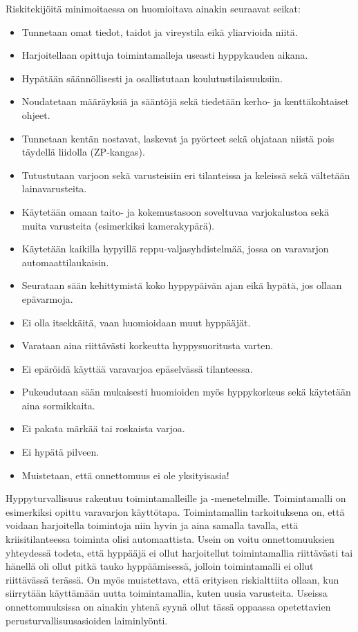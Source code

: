 Riskitekijöitä minimoitaessa on huomioitava ainakin seuraavat seikat: 

\begin{itemize}
\item  Tunnetaan omat tiedot, taidot ja vireystila eikä yliarvioida niitä. 
\item  Harjoitellaan opittuja toimintamalleja useasti hyppykauden aikana. 
\item  Hypätään säännöllisesti ja osallistutaan koulutustilaisuuksiin. 
\item  Noudatetaan määräyksiä ja sääntöjä sekä tiedetään kerho- ja kenttäkohtaiset ohjeet. 
\item  Tunnetaan kentän nostavat, laskevat ja pyörteet sekä ohjataan niistä pois täydellä liidolla (ZP-kangas). 
\item  Tutustutaan varjoon sekä varusteisiin eri tilanteissa ja keleissä sekä vältetään lainavarusteita. 
\item  Käytetään omaan taito- ja kokemustasoon soveltuvaa varjokalustoa sekä muita varusteita (esimerkiksi kamerakypärä). 
\item  Käytetään kaikilla hypyillä reppu-valjasyhdistelmää, jossa on varavarjon automaattilaukaisin. 
\item  Seurataan sään kehittymistä koko hyppypäivän ajan eikä hypätä, jos ollaan epävarmoja. 
\item  Ei olla itsekkäitä, vaan huomioidaan muut hyppääjät. 
\item  Varataan aina riittävästi korkeutta hyppysuoritusta varten. 
\item  Ei epäröidä käyttää varavarjoa epäselvässä tilanteessa. 
\item  Pukeudutaan sään mukaisesti huomioiden myös hyppykorkeus sekä käytetään aina sormikkaita. 
\item  Ei pakata märkää tai roskaista varjoa. 
\item  Ei hypätä pilveen. 
\item  Muistetaan, että onnettomuus ei ole yksityisasia! 
\end{itemize}

Hyppyturvallisuus rakentuu toimintamalleille ja -menetelmille. Toimintamalli on esimerkiksi opittu varavarjon käyttötapa. Toimintamallin tarkoituksena on, että voidaan harjoitella toimintoja niin hyvin ja aina samalla tavalla, että kriisitilanteessa toiminta olisi automaattista. Usein on voitu onnettomuuksien yhteydessä todeta, että hyppääjä ei ollut harjoitellut toimintamallia riittävästi tai hänellä oli ollut pitkä tauko hyppäämisessä, jolloin toimintamalli ei ollut riittävässä terässä. On myös muistettava, että erityisen riskialttiita ollaan, kun siirrytään käyttämään uutta toimintamallia, kuten uusia varusteita. Useissa onnettomuuksissa on ainakin yhtenä syynä ollut tässä oppaassa opetettavien perusturvallisuusasioiden laiminlyönti. 


